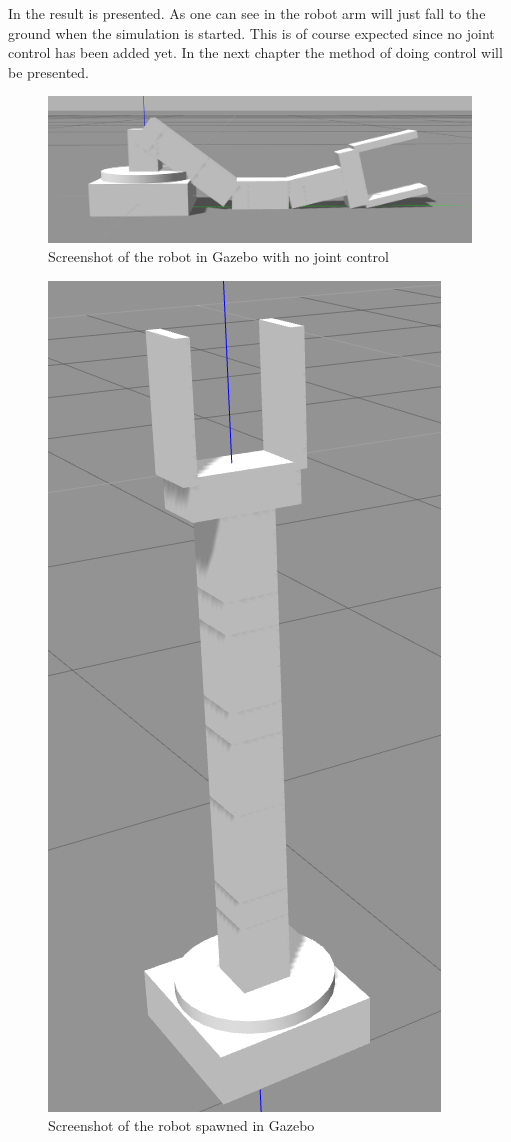 In  the result is presented. As one can see in  the robot arm will just fall to the ground when the simulation is started. This is of course expected since no joint control has been added yet. In the next chapter the method of doing control will be presented. 

\begin{figure}[htbp]
  \centering
  \includegraphics[width=.9\textwidth]{img/gazeG.png}
  \caption{Screenshot of the robot in Gazebo with no joint control}
  \label{fig:flaccid}
\end{figure}


\begin{figure}[htbp]
  \centering
  \includegraphics[height=.7\textheight]{img/robotGazUP.png}
  \caption{Screenshot of the robot spawned in Gazebo}
  \label{fig:stiff}
\end{figure}

